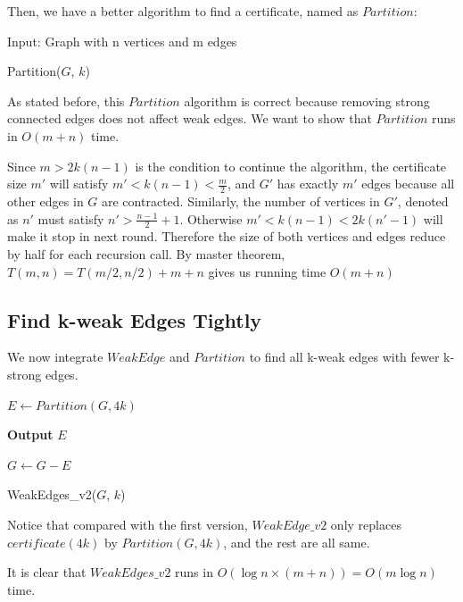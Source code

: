 \documentclass{article}
\begin{document}
Then, we have a better algorithm to find a certificate, named as $Partition$:

\begin{algorithm}[H] \label{partition_algo}
\SetAlgoLined
 Input: Graph with n vertices and m edges
    
        
\caption{Partition($G$, $k$)}
\end{algorithm}

As stated before, this $Partition$ algorithm is correct because removing strong connected edges does not affect weak edges. We want to show that  $Partition$ runs in $O(m+n)$ time. 

Since $m > 2k(n-1)$ is the condition to continue the algorithm, the certificate size $m'$ will satisfy $m' < k(n-1) < \frac{m}{2}$, and $G'$ has exactly $m'$ edges because all other edges in $G$ are contracted. Similarly, the number of vertices in $G'$, denoted as $n'$ must satisfy $n' > \frac{n-1}{2} + 1$. Otherwise $m' < k(n-1) < 2k(n'-1)$ will make it stop in next round. Therefore the size of both vertices and edges reduce by half for each recursion call. By master theorem, $T(m, n) = T(m/2, n/2) + m + n$ gives us running time $O(m+n)$

\subsection{Find k-weak Edges Tightly}
We now integrate $Weak Edge$ and $Partition$ to find all k-weak edges with fewer k-strong edges. 

\begin{algorithm}[H]
\SetAlgoLined

     {
        $E \gets Partition(G, 4k)$\;
        
        \textbf{Output} $E$\;
        
        $G \gets G - E$\;
    }
        
\caption{WeakEdges\_v2($G$, $k$)}
\end{algorithm}

Notice that compared with the first version, $Weak Edge\_v2$ only replaces $certificate(4k)$ by $Partition(G, 4k)$, and the rest are all same.

It is clear that $Weak Edges\_v2$ runs in $O(\log n \times (m+n)) = O(m \log n)$ time. 
\end{document}
